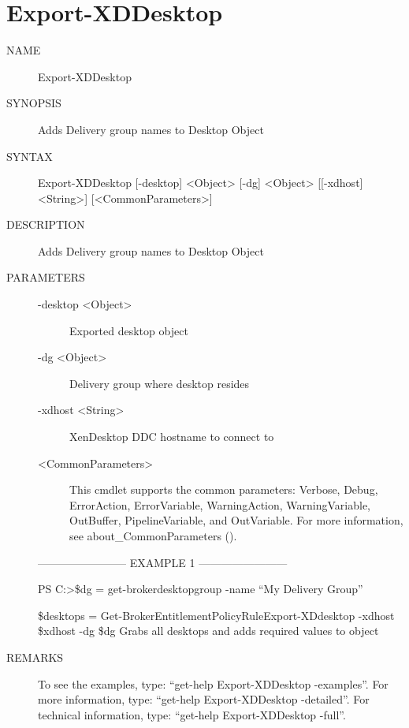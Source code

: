 \documentclass[letterpaper,10pt,english]{sphinxmanual}
\begin{document}
\section{Export-XDDesktop}
\label{\detokenize{cmd_export:export-xddesktop}}\begin{description}
\item[{NAME}] \leavevmode
Export-XDDesktop

\item[{SYNOPSIS}] \leavevmode
Adds Delivery group names to Desktop Object

\item[{SYNTAX}] \leavevmode
Export-XDDesktop {[}-desktop{]} \textless{}Object\textgreater{} {[}-dg{]} \textless{}Object\textgreater{} {[}{[}-xdhost{]} \textless{}String\textgreater{}{]} {[}\textless{}CommonParameters\textgreater{}{]}

\item[{DESCRIPTION}] \leavevmode
Adds Delivery group names to Desktop Object

\item[{PARAMETERS}] \leavevmode\begin{description}
\item[{-desktop \textless{}Object\textgreater{}}] \leavevmode
Exported desktop object

\item[{-dg \textless{}Object\textgreater{}}] \leavevmode
Delivery group where desktop resides

\item[{-xdhost \textless{}String\textgreater{}}] \leavevmode
XenDesktop DDC hostname to connect to

\item[{\textless{}CommonParameters\textgreater{}}] \leavevmode
This cmdlet supports the common parameters: Verbose, Debug,
ErrorAction, ErrorVariable, WarningAction, WarningVariable,
OutBuffer, PipelineVariable, and OutVariable. For more information, see
about\_CommonParameters ().

\end{description}

————————\textendash{} EXAMPLE 1 ————————\textendash{}

PS C:\textgreater{}\$dg = get-brokerdesktopgroup -name “My Delivery Group”

\$desktops = Get-BrokerEntitlementPolicyRule\textbar{}Export-XDdesktop -xdhost \$xdhost -dg \$dg
Grabs all desktops and adds required values to object

\item[{REMARKS}] \leavevmode
To see the examples, type: “get-help Export-XDDesktop -examples”.
For more information, type: “get-help Export-XDDesktop -detailed”.
For technical information, type: “get-help Export-XDDesktop -full”.

\end{description}
\end{document}
